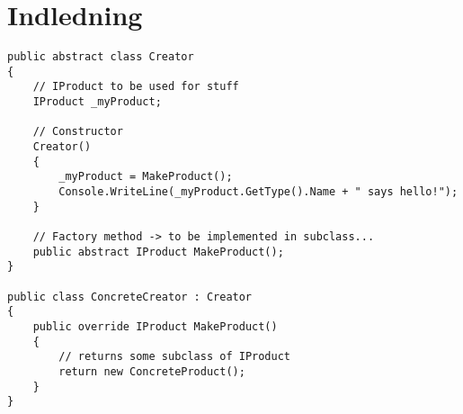 \chapter{Indledning}


\lipsum[5-7]

\begin{lstlisting}[caption=a test for a C\# code, label=lst:test]
public abstract class Creator
{
	// IProduct to be used for stuff
	IProduct _myProduct;
	
	// Constructor
	Creator()
	{
		_myProduct = MakeProduct();
		Console.WriteLine(_myProduct.GetType().Name + " says hello!");
	}
	
	// Factory method -> to be implemented in subclass...
	public abstract IProduct MakeProduct();
}
	
public class ConcreteCreator : Creator
{
	public override IProduct MakeProduct()
	{
		// returns some subclass of IProduct
		return new ConcreteProduct();
	}
}
\end{lstlisting}